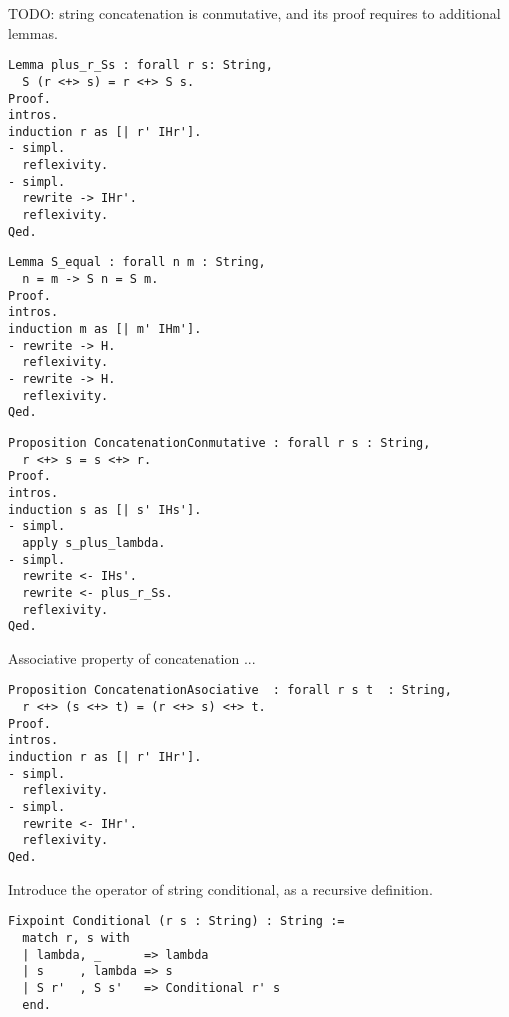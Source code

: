 {\color{red} TODO: string concatenation is conmutative, and its proof requires to additional lemmas.}

\begin{sourcecode}
{\scriptsize \begin{verbatim}
Lemma plus_r_Ss : forall r s: String,
  S (r <+> s) = r <+> S s.
Proof.
intros.
induction r as [| r' IHr'].
- simpl.
  reflexivity.
- simpl.
  rewrite -> IHr'.
  reflexivity.
Qed.
\end{verbatim}}
\end{sourcecode}

\begin{sourcecode}
{\scriptsize \begin{verbatim}
Lemma S_equal : forall n m : String,
  n = m -> S n = S m.
Proof.
intros.
induction m as [| m' IHm'].
- rewrite -> H.
  reflexivity.
- rewrite -> H.
  reflexivity.
Qed.
\end{verbatim}}
\end{sourcecode}

\begin{sourcecode}
{\scriptsize \begin{verbatim}
Proposition ConcatenationConmutative : forall r s : String,
  r <+> s = s <+> r.
Proof.
intros.
induction s as [| s' IHs'].
- simpl.
  apply s_plus_lambda.
- simpl.
  rewrite <- IHs'.
  rewrite <- plus_r_Ss.
  reflexivity.
Qed.
\end{verbatim}}
\end{sourcecode}

{\color{red} Associative property of concatenation ... }

\begin{sourcecode}
{\scriptsize \begin{verbatim}
Proposition ConcatenationAsociative  : forall r s t  : String,
  r <+> (s <+> t) = (r <+> s) <+> t.
Proof.
intros.
induction r as [| r' IHr'].
- simpl.
  reflexivity.
- simpl.
  rewrite <- IHr'.
  reflexivity.
Qed.
\end{verbatim}}
\end{sourcecode}

{\color{red} Introduce the operator of string conditional, as a recursive definition.}

\begin{sourcecode}
{\scriptsize \begin{verbatim}
Fixpoint Conditional (r s : String) : String :=
  match r, s with
  | lambda, _      => lambda
  | s     , lambda => s
  | S r'  , S s'   => Conditional r' s
  end.
\end{verbatim}}
\end{sourcecode}

